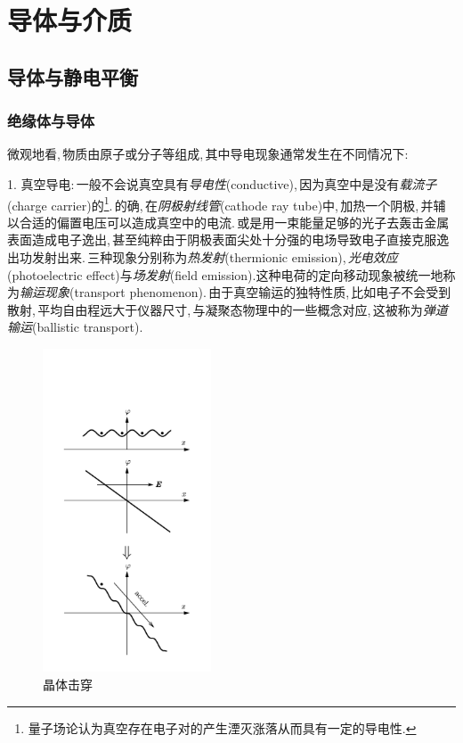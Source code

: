 \chapter{导体与介质}




\section{导体与静电平衡}

\subsection{绝缘体与导体}



微观地看,\,物质由原子或分子等组成,\,其中导电现象通常发生在不同情况下:

	\vspace{0.3cm}1. 真空导电:\,一般不会说真空具有\emph{导电性}(conductive),\,因为真空中是没有\emph{载流子}(charge carrier)的\footnote{量子场论认为真空存在电子对的产生湮灭涨落从而具有一定的导电性.}.\,的确,\,在\emph{阴极射线管}(cathode ray tube)中,\,加热一个阴极,\,并辅以合适的偏置电压可以造成真空中的电流.\,或是用一束能量足够的光子去轰击金属表面造成电子逸出,\,甚至纯粹由于阴极表面尖处十分强的电场导致电子直接克服逸出功发射出来.\,三种现象分别称为\emph{热发射}(thermionic emission),\,\emph{光电效应}(photoelectric effect)与\emph{场发射}(field emission).这种电荷的定向移动现象被统一地称为\emph{输运现象}(transport phenomenon).\,由于真空输运的独特性质,\,比如电子不会受到散射,\,平均自由程远大于仪器尺寸,\,与凝聚态物理中的一些概念对应,\,这被称为\emph{弹道输运}(ballistic transport).

	\begin{figure}
	\vspace{-1.6cm}
	\centering
	\includegraphics[width=5cm]{image/7-2-1.png}
	\caption{晶体击穿}
	\end{figure}

